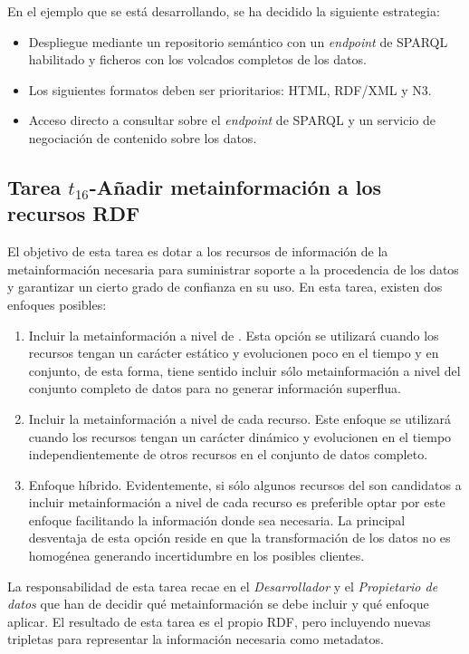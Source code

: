 En el ejemplo que se está desarrollando, se ha decidido la siguiente estrategia:

\begin{itemize}
 \item Despliegue mediante un repositorio semántico con un \textit{endpoint} de \gls{SPARQL} habilitado y ficheros con los volcados completos de los datos.
 \item Los siguientes formatos deben ser prioritarios: \gls{HTML}, \gls{RDF/XML} y \gls{N3}.
 \item Acceso directo a consultar sobre el \textit{endpoint} de \gls{SPARQL} y un servicio de negociación de contenido sobre los datos.
\end{itemize}

\subsection{Tarea $t_{16}$-Añadir metainformación a los recursos RDF}\label{t16-metodos}
El objetivo de esta tarea es dotar a los recursos de información de la metainformación 
necesaria para suministrar soporte a la procedencia de los datos y garantizar 
un cierto grado de confianza en su uso. En esta tarea, existen dos enfoques 
posibles:
\begin{enumerate}
 \item Incluir la metainformación a nivel de \dataset. Esta opción se utilizará cuando 
los recursos tengan un carácter estático y evolucionen poco en el tiempo y en conjunto, de esta forma, 
tiene sentido incluir sólo metainformación a nivel del conjunto completo de datos para no generar 
información superflua.
 \item Incluir la metainformación a nivel de cada recurso. Este enfoque se utilizará cuando 
los recursos tengan un carácter dinámico y evolucionen en el tiempo independientemente de otros 
recursos en el conjunto de datos completo. 
 \item Enfoque híbrido. Evidentemente, si sólo algunos recursos del \dataset son candidatos 
a incluir metainformación a nivel de cada recurso es preferible optar por este enfoque facilitando 
la información donde sea necesaria. La principal desventaja de esta opción reside en que la transformación 
de los datos no es homogénea generando incertidumbre en los posibles clientes. 
\end{enumerate}

La responsabilidad de esta tarea recae en el \textit{Desarrollador} y el \textit{Propietario de datos} que han de decidir 
qué metainformación se debe incluir y qué enfoque aplicar. El resultado de esta tarea es el propio 
\dataset \gls{RDF}, pero incluyendo nuevas tripletas para representar la información necesaria como 
metadatos.

